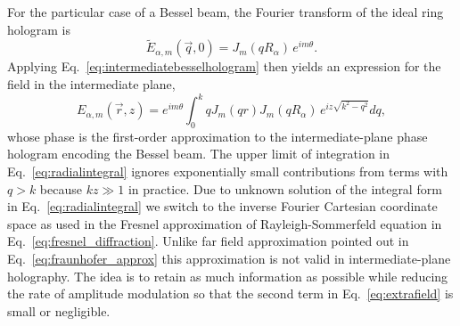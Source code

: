 For the particular case of a Bessel beam,
the Fourier transform of the ideal ring hologram is
\begin{equation}
  \tilde{E}_{\alpha,m}(\vec{q},0)
  =
  J_m(qR_\alpha) \, e^{i m \theta}.
\end{equation}
Applying Eq.~\eqref{eq:intermediatebesselhologram}
then yields an expression for the field in the 
intermediate plane,
\begin{equation}
  \label{eq:radialintegral}
  E_{\alpha,m}(\vec{r},z)
  =
  e^{i m \theta}
  \int_0^k 
  q 
  J_m(q r) 
  J_m(qR_\alpha) \, 
  e^{i z \sqrt{k^2 - q^2}} dq ,
\end{equation}
whose phase is the first-order approximation to the
intermediate-plane phase hologram encoding the Bessel beam.
The upper limit of integration in Eq.~\eqref{eq:radialintegral}
ignores exponentially small contributions from terms with
$q > k$ because $kz \gg 1$ in practice. Due to unknown solution of
the integral form in Eq.~\eqref{eq:radialintegral} we switch to the inverse Fourier
Cartesian coordinate space as used in the Fresnel approximation of 
Rayleigh-Sommerfeld equation in Eq.~\eqref{eq:fresnel_diffraction}. Unlike far field
approximation pointed out in Eq.~\eqref{eq:fraunhofer_approx} this approximation is
not valid in intermediate-plane holography. The idea is to retain as much information
as possible while reducing the rate of amplitude modulation so that the second term 
in Eq.~\eqref{eq:extrafield} is small or negligible.

